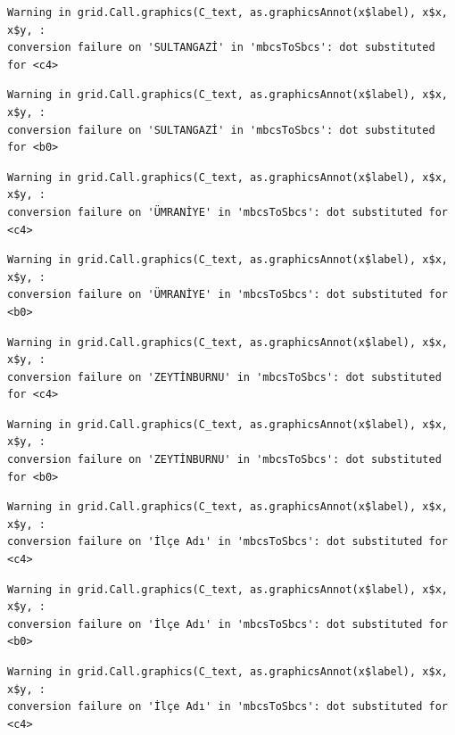 \documentclass[
  11pt,
  a4paper,
  DIV=11,
  numbers=noendperiod]{scrartcl}
\begin{document}
\begin{verbatim}
Warning in grid.Call.graphics(C_text, as.graphicsAnnot(x$label), x$x, x$y, :
conversion failure on 'SULTANGAZİ' in 'mbcsToSbcs': dot substituted for <c4>
\end{verbatim}

\begin{verbatim}
Warning in grid.Call.graphics(C_text, as.graphicsAnnot(x$label), x$x, x$y, :
conversion failure on 'SULTANGAZİ' in 'mbcsToSbcs': dot substituted for <b0>
\end{verbatim}

\begin{verbatim}
Warning in grid.Call.graphics(C_text, as.graphicsAnnot(x$label), x$x, x$y, :
conversion failure on 'ÜMRANİYE' in 'mbcsToSbcs': dot substituted for <c4>
\end{verbatim}

\begin{verbatim}
Warning in grid.Call.graphics(C_text, as.graphicsAnnot(x$label), x$x, x$y, :
conversion failure on 'ÜMRANİYE' in 'mbcsToSbcs': dot substituted for <b0>
\end{verbatim}

\begin{verbatim}
Warning in grid.Call.graphics(C_text, as.graphicsAnnot(x$label), x$x, x$y, :
conversion failure on 'ZEYTİNBURNU' in 'mbcsToSbcs': dot substituted for <c4>
\end{verbatim}

\begin{verbatim}
Warning in grid.Call.graphics(C_text, as.graphicsAnnot(x$label), x$x, x$y, :
conversion failure on 'ZEYTİNBURNU' in 'mbcsToSbcs': dot substituted for <b0>
\end{verbatim}

\begin{verbatim}
Warning in grid.Call.graphics(C_text, as.graphicsAnnot(x$label), x$x, x$y, :
conversion failure on 'İlçe Adı' in 'mbcsToSbcs': dot substituted for <c4>
\end{verbatim}

\begin{verbatim}
Warning in grid.Call.graphics(C_text, as.graphicsAnnot(x$label), x$x, x$y, :
conversion failure on 'İlçe Adı' in 'mbcsToSbcs': dot substituted for <b0>
\end{verbatim}

\begin{verbatim}
Warning in grid.Call.graphics(C_text, as.graphicsAnnot(x$label), x$x, x$y, :
conversion failure on 'İlçe Adı' in 'mbcsToSbcs': dot substituted for <c4>
\end{verbatim}
\end{document}
